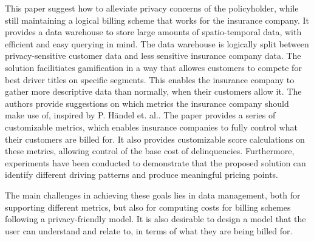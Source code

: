 This paper suggest how to alleviate privacy concerns of the policyholder, while still maintaining a logical billing scheme that works for the insurance company. It provides a data warehouse to store large amounts of spatio-temporal data, with efficient and easy querying in mind. The data warehouse is logically split between privacy-sensitive customer data and less sensitive insurance company data. The solution facilitiates gamification in a way that allowes customers to compete for best driver titles on specific segments. This enables the insurance company to gather more descriptive data than normally, when their customers allow it. The authors provide suggestions on which metrics the insurance company should make use of, inspired by P. Händel et. al.\cite{art:insurtelematics}\cite{art:smartphonemonitor}. The paper provides a series of customizable metrics, which enables insurance companies to fully control what their customers are billed for. It also provides customizable score calculations on these metrics, allowing control of the base cost of delinquencies. Furthermore, experiments have been conducted to demonstrate that the proposed solution can identify different driving patterns and produce meaningful pricing points.

The main challenges in achieving these goals lies in data management, both for supporting different metrics, but also for computing costs for billing schemes following a privacy-friendly model. It is also desirable to design a model that the user can understand and relate to, in terms of what they are being billed for.